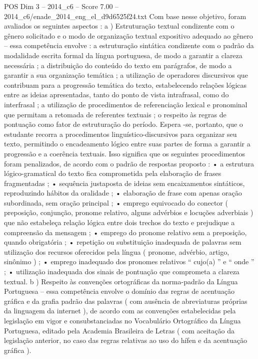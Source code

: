 \begin{textsample}{POS Dim 3 – 2014\_c6 – Score 7.00 – 2014\_c6/enade\_2014\_eng\_el\_d9d6525f24.txt}
Com base nesse objetivo, foram avaliados os seguintes aspectos : a ) Estruturação textual condizente com o gênero solicitado e o modo de organização textual expositivo adequado ao gênero – essa competência envolve : a estruturação sintática condizente com o padrão da modalidade escrita formal da língua portuguesa, de modo a garantir a clareza necessária ; a distribuição do conteúdo do texto em parágrafos, de modo a garantir a sua organização temática ; a utilização de operadores discursivos que contribuam para a progressão temática do texto, estabelecendo relações lógicas entre as ideias apresentadas, tanto do ponto de vista intrafrasal, como do interfrasal ; a utilização de procedimentos de referenciação lexical e pronominal que permitam a retomada de referentes textuais ; o respeito às regras de pontuação como fator de estruturação do período.
Espera -se, portanto, que o estudante recorra a procedimentos linguístico-discursivos para organizar seu texto, permitindo o encadeamento lógico entre suas partes de forma a garantir a progressão e a coerência textuais.
Isso significa que os seguintes procedimentos foram penalizados, de acordo com o padrão de respostas proposto : • a estrutura lógico-gramatical do texto fica comprometida pela elaboração de frases fragmentadas ; • sequência justaposta de ideias sem encaixamentos sintáticos, reproduzindo hábitos da oralidade ; • elaboração de frase com apenas oração subordinada, sem oração principal ; • emprego equivocado do conector ( preposição, conjunção, pronome relativo, alguns advérbios e locuções adverbiais ) que não estabeleça relação lógica entre dois trechos do texto e prejudique a compreensão da mensagem ; • emprego do pronome relativo sem a preposição, quando obrigatória ; • repetição ou substituição inadequada de palavras sem utilização dos recursos oferecidos pela língua ( pronome, advérbio, artigo, sinônimo ) ; • emprego inadequado dos pronomes relativos “ cujo(a) ” e “ onde ” ; • utilização inadequada dos sinais de pontuação que comprometa a clareza textual. b ) Respeito às convenções ortográficas da norma-padrão da Língua Portuguesa – essa competência envolve o domínio das regras de acentuação gráfica e da grafia padrão das palavras ( com ausência de abreviaturas próprias da linguagem da internet ), de acordo com as convenções estabelecidas pela legislação em vigor e consubstanciadas no Vocabulário Ortográfico da Língua Portuguesa, editado pela Academia Brasileira de Letras ( com aceitação da legislação anterior, no caso das regras relativas ao uso do hífen e da acentuação gráfica ).

\end{textsample}
